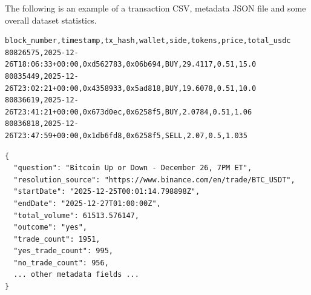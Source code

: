 \documentclass[11pt]{article}
\begin{document}
The following is an example of a transaction CSV, metadata JSON file and some overall dataset statistics.

\begin{lstlisting}[caption={Example transaction CSV used in the dataset.},label={lst:csv_example}]
block_number,timestamp,tx_hash,wallet,side,tokens,price,total_usdc
80826575,2025-12-26T18:06:33+00:00,0xd562783,0x06b694,BUY,29.4117,0.51,15.0
80835449,2025-12-26T23:02:21+00:00,0x4358933,0x5ad818,BUY,19.6078,0.51,10.0
80836619,2025-12-26T23:41:21+00:00,0x673d0ec,0x6258f5,BUY,2.0784,0.51,1.06
80836818,2025-12-26T23:47:59+00:00,0x1db6fd8,0x6258f5,SELL,2.07,0.5,1.035
\end{lstlisting}

\begin{lstlisting}[caption={Example market metadata JSON.},label={lst:json_example}]
{
  "question": "Bitcoin Up or Down - December 26, 7PM ET",
  "resolution_source": "https://www.binance.com/en/trade/BTC_USDT",
  "startDate": "2025-12-25T00:01:14.798898Z",
  "endDate": "2025-12-27T01:00:00Z",
  "total_volume": 61513.576147,
  "outcome": "yes",
  "trade_count": 1951,
  "yes_trade_count": 995,
  "no_trade_count": 956,
  ... other metadata fields ...
}
\end{lstlisting}
\end{document}
